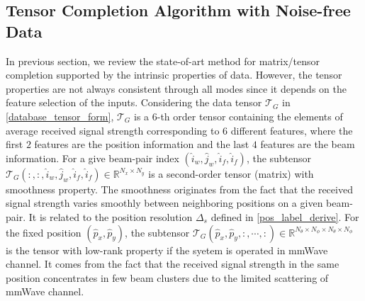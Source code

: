 \documentclass[12pt, draftcls, onecolumn]{IEEEtran}
\theoremstyle{plain}
\theoremstyle{definition}
\theoremstyle{remark}
\newcommand{\nt}[1]{\textcolor{red}{\textbf{[#1]}}}
\begin{document}





\subsection{Tensor Completion Algorithm with Noise-free Data}
In previous section, we review the state-of-art method for matrix/tensor completion supported by the intrinsic properties of data. 
However, the tensor properties are not always consistent through all modes since it depends on the feature selection of the inputs.
Considering the data tensor $\mathcal{T}_G$ in \eqref{database_tensor_form}, $\mathcal{T}_G$ is a $6$-th order tensor containing the elements of average received signal strength corresponding to $6$ different features, where the first $2$ features are the position information and the last $4$ features are the beam information.
For a give beam-pair index $(\hat i_w,\hat j_w,\hat i_f,\hat i_f)$, the subtensor $\mathcal{T}_G(:,:,\hat i_w,\hat j_w,\hat i_f,\hat i_f)\in\mathbb{R}^{N_x\times N_y}$ is a second-order tensor (matrix) with smoothness property.
The smoothness originates from the fact that the received signal strength varies smoothly between neighboring positions on a given beam-pair.
It is related to the position resolution $\Delta_s$ defined in \eqref{pos_label_derive}.
For the fixed position $(\hat p_x,\hat p_y)$, the subtensor $\mathcal{T}_G(\hat p_x,\hat p_y,:,\cdots,:)\in\mathbb{R}^{N_\theta\times N_\phi\times N_\theta \times N_\phi}$ is the tensor with low-rank property if the syetem is operated in mmWave channel.
It comes from the fact that the received signal strength in the same position concentrates in few beam clusters due to the limited scattering of mmWave channel.
\end{document}

